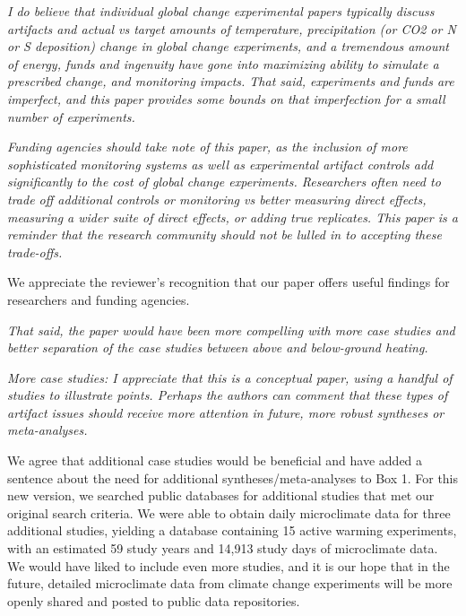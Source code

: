 \documentclass[11pt,a4paper]{letter}
\begin{document}
\begin{letter}{}
\par \emph{I do believe that individual global change experimental papers typically discuss artifacts and actual vs target amounts of temperature, precipitation (or CO2 or N or S deposition) change in global change experiments, and a  tremendous amount of energy, funds and ingenuity have gone into maximizing ability to simulate a prescribed change, and monitoring impacts.  That said, experiments and funds are imperfect, and this paper provides some bounds on that imperfection for a small number of experiments.}

\par \emph{Funding agencies should take note of this paper, as the inclusion of more sophisticated monitoring systems as well as experimental artifact controls add significantly to the cost of global change experiments.  Researchers often need to trade off additional controls or monitoring vs better measuring direct effects, measuring a wider suite of direct effects, or adding true replicates.  This paper is a reminder that the research community should not be lulled in to accepting these trade-offs.}

\par We appreciate the reviewer's recognition that our paper offers useful findings for researchers and funding agencies. 

\par \emph{That said, the paper would have been more compelling with more case studies and better separation of the case studies between above and below-ground heating.}

\par \emph{More case studies:  I appreciate that this is a conceptual paper, using a handful of studies to illustrate points.  Perhaps the authors can comment that these types of artifact issues should receive more attention in future, more robust syntheses or meta-analyses.}
\par We agree that additional case studies would be beneficial and have added a sentence about the need for additional syntheses/meta-analyses to Box 1. For this new version, we searched public databases for additional studies that met our original search criteria. We were able to obtain daily microclimate data for three additional studies, yielding a database containing 15 active warming experiments, with an estimated 59 study years and 14,913 study days of microclimate data. We would have liked to include even more studies, and it is our hope that in the future, detailed microclimate data from climate change experiments will be more openly shared and posted to public data repositories.   


\end{letter}
\end{document}
